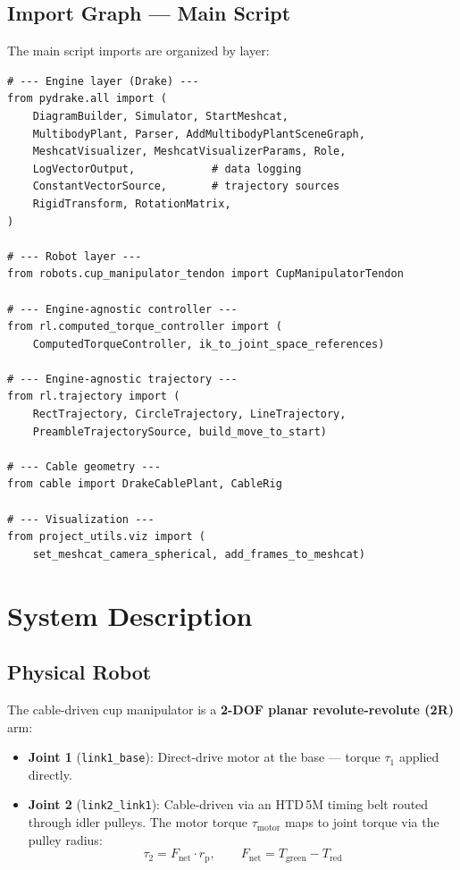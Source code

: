 \documentclass[11pt,a4paper]{article}
\newcommand{\rp}{r_{\mathrm{p}}}
\begin{document}
\subsection{Import Graph --- Main Script}

The main script imports are organized by layer:

\begin{lstlisting}[caption={Import structure of the main simulation script.}]
# --- Engine layer (Drake) ---
from pydrake.all import (
    DiagramBuilder, Simulator, StartMeshcat,
    MultibodyPlant, Parser, AddMultibodyPlantSceneGraph,
    MeshcatVisualizer, MeshcatVisualizerParams, Role,
    LogVectorOutput,            # data logging
    ConstantVectorSource,       # trajectory sources
    RigidTransform, RotationMatrix,
)

# --- Robot layer ---
from robots.cup_manipulator_tendon import CupManipulatorTendon

# --- Engine-agnostic controller ---
from rl.computed_torque_controller import (
    ComputedTorqueController, ik_to_joint_space_references)

# --- Engine-agnostic trajectory ---
from rl.trajectory import (
    RectTrajectory, CircleTrajectory, LineTrajectory,
    PreambleTrajectorySource, build_move_to_start)

# --- Cable geometry ---
from cable import DrakeCablePlant, CableRig

# --- Visualization ---
from project_utils.viz import (
    set_meshcat_camera_spherical, add_frames_to_meshcat)
\end{lstlisting}

\newpage

\section{System Description}

\subsection{Physical Robot}

The cable-driven cup manipulator is a \textbf{2-DOF planar revolute-revolute (2R)} arm:

\begin{itemize}[leftmargin=2em]
    \item \textbf{Joint 1} (\texttt{link1\_base}): Direct-drive motor at the base --- torque $\tau_1$ applied directly.
    \item \textbf{Joint 2} (\texttt{link2\_link1}): Cable-driven via an HTD\,5M timing belt routed through idler pulleys. The motor torque $\tau_{\mathrm{motor}}$ maps to joint torque via the pulley radius:
    \[
        \tau_2 = F_{\mathrm{net}} \cdot \rp, \qquad F_{\mathrm{net}} = T_{\mathrm{green}} - T_{\mathrm{red}}
    \]
\end{itemize}
\end{document}
